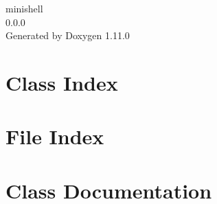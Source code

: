 \documentclass[twoside]{book}
\newcommand{\+}{\discretionary{\mbox{\scriptsize$\hookleftarrow$}}{}{}}
\newcommand{\clearemptydoublepage}{%
    \newpage{\pagestyle{empty}\cleardoublepage}%
  }
\begin{document}
  \raggedbottom
    \hypersetup{pageanchor=false,
                bookmarksnumbered=true,
                pdfencoding=unicode
               }
  \begin{titlepage}
  \vspace*{7cm}
  \begin{center}%
  {\Large minishell}\\
  [1ex]\large 0.\+0.\+0 \\
  \vspace*{1cm}
  {\large Generated by Doxygen 1.11.0}\\
  \end{center}
  \end{titlepage}
  \clearemptydoublepage
  \tableofcontents
  \clearemptydoublepage
  \hypersetup{pageanchor=true}




\chapter{Class Index}

\chapter{File Index}

\chapter{Class Documentation}







\end{document}
